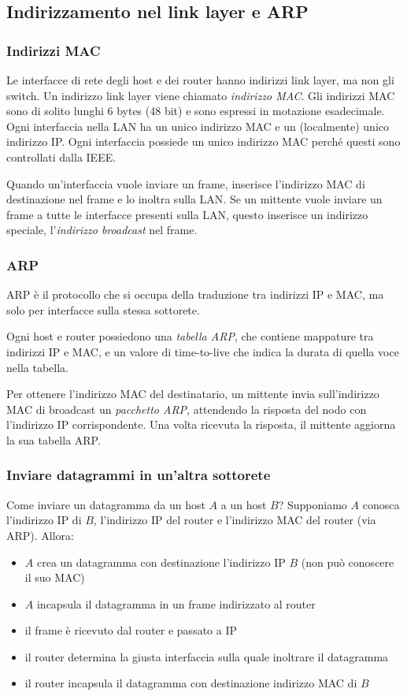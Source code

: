 \documentclass[11pt]{book}
\begin{document}
\subsection{Indirizzamento nel link layer e ARP}
\subsubsection{Indirizzi MAC}
Le interfacce di rete degli host e dei router hanno indirizzi link layer, ma non gli switch. Un indirizzo link layer viene 
chiamato \textit{indirizzo MAC}. Gli indirizzi MAC sono di solito lunghi 6 bytes (48 bit) e sono espressi in motazione 
esadecimale. Ogni interfaccia nella LAN ha un unico indirizzo MAC e un (localmente) unico indirizzo IP. Ogni interfaccia 
possiede un unico indirizzo MAC perché questi sono controllati dalla IEEE. 

Quando un'interfaccia vuole inviare un frame, inserisce l'indirizzo MAC di destinazione nel frame e lo inoltra sulla LAN.
Se un mittente vuole inviare un frame a tutte le interfacce presenti sulla LAN, questo inserisce un indirizzo speciale,
l'\textit{indirizzo broadcast} nel frame.
\subsubsection{ARP}
ARP è il protocollo che si occupa della traduzione tra indirizzi IP e MAC, ma solo per interfacce sulla stessa sottorete.

Ogni host e router possiedono una \textit{tabella ARP}, che contiene mappature tra indirizzi IP e MAC, e un valore di 
time-to-live che indica la durata di quella voce nella tabella.  

Per ottenere l'indirizzo MAC del destinatario, un mittente invia sull'indirizzo MAC di broadcast un \textit{pacchetto ARP},
attendendo la risposta del nodo con l'indirizzo IP corrispondente. Una volta ricevuta la risposta, il mittente aggiorna 
la sua tabella ARP.
\subsubsection{Inviare datagrammi in un'altra sottorete}
Come inviare un datagramma da un host $A$ a un host $B$? Supponiamo $A$ conosca l'indirizzo IP di $B$, l'indirizzo IP del
router e l'indirizzo MAC del router (via ARP). Allora:
\begin{itemize}
    \item $A$ crea un datagramma con destinazione l'indirizzo IP $B$ (non può conoscere il suo MAC)
    \item $A$ incapsula il datagramma in un frame indirizzato al router
    \item il frame è ricevuto dal router e passato a IP
    \item il router determina la giusta interfaccia sulla quale inoltrare il datagramma 
    \item il router incapsula il datagramma con destinazione indirizzo MAC di $B$
\end{itemize}
\end{document}

